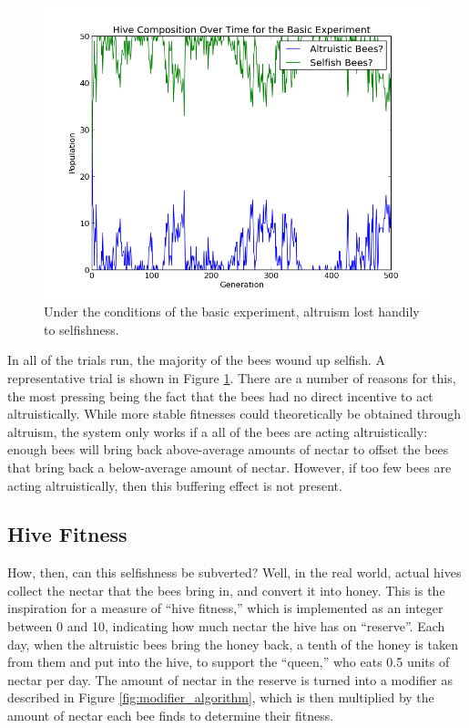 \documentclass[11pt]{article}
\begin{document}
			\begin{figure}[tbpH!]
				\begin{center}
					\includegraphics[scale=.5]{results/basic_comp.png}
				\end{center}
				\caption{Under the conditions of the basic experiment, altruism lost handily to selfishness.}
				\label{fig:basic_experiment_composition}
			\end{figure}

			In all of the trials run, the majority of the bees wound up selfish. A representative trial is shown in Figure \ref{fig:basic_experiment_composition}. There are a number of reasons for this, the most pressing being the fact that the bees had no direct incentive to act altruistically. While more stable fitnesses could theoretically be obtained through altruism, the system only works if a all of the bees are acting altruistically: enough bees will bring back above-average amounts of nectar to offset the bees that bring back a below-average amount of nectar. However, if too few bees are acting altruistically, then this buffering effect is not present. 


		\FloatBarrier
		\subsection{Hive Fitness} %
		\label{sub:hive_fitness}
				How, then, can this selfishness be subverted? Well, in the real world, actual hives collect the	 nectar that the bees bring in, and convert it into honey. This is the inspiration for a measure of ``hive fitness,'' which is implemented as an integer between 0 and 10, indicating how much nectar the hive has on ``reserve''. Each day, when the altruistic bees bring the honey back, a tenth of the honey is taken from them and put into the hive, to support the ``queen,'' who eats 0.5 units of nectar per day. The amount of nectar in the reserve is turned into a modifier as described in Figure \ref{fig:modifier_algorithm}, which is then multiplied by the amount of nectar each bee finds to determine their fitness.
\end{document}
